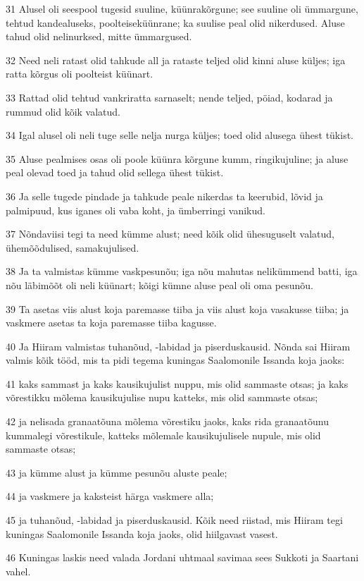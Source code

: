 \par 31 Alusel oli seespool tugesid suuline, küünrakõrgune; see suuline oli ümmargune, tehtud kandealuseks, poolteiseküünrane; ka suulise peal olid nikerdused. Aluse tahud olid nelinurksed, mitte ümmargused.
\par 32 Need neli ratast olid tahkude all ja rataste teljed olid kinni aluse küljes; iga ratta kõrgus oli poolteist küünart.
\par 33 Rattad olid tehtud vankriratta sarnaselt; nende teljed, pöiad, kodarad ja rummud olid kõik valatud.
\par 34 Igal alusel oli neli tuge selle nelja nurga küljes; toed olid alusega ühest tükist.
\par 35 Aluse pealmises osas oli poole küünra kõrgune kumm, ringikujuline; ja aluse peal olevad toed ja tahud olid sellega ühest tükist.
\par 36 Ja selle tugede pindade ja tahkude peale nikerdas ta keerubid, lõvid ja palmipuud, kus iganes oli vaba koht, ja ümberringi vanikud.
\par 37 Nõndaviisi tegi ta need kümme alust; need kõik olid ühesuguselt valatud, ühemõõdulised, samakujulised.
\par 38 Ja ta valmistas kümme vaskpesunõu; iga nõu mahutas nelikümmend batti, iga nõu läbimõõt oli neli küünart; kõigi kümne aluse peal oli oma pesunõu.
\par 39 Ta asetas viis alust koja paremasse tiiba ja viis alust koja vasakusse tiiba; ja vaskmere asetas ta koja paremasse tiiba kagusse.
\par 40 Ja Hiiram valmistas tuhanõud, -labidad ja piserduskausid. Nõnda sai Hiiram valmis kõik tööd, mis ta pidi tegema kuningas Saalomonile Issanda koja jaoks:
\par 41 kaks sammast ja kaks kausikujulist nuppu, mis olid sammaste otsas; ja kaks võrestikku mõlema kausikujulise nupu katteks, mis olid sammaste otsas;
\par 42 ja nelisada granaatõuna mõlema võrestiku jaoks, kaks rida granaatõunu kummalegi võrestikule, katteks mõlemale kausikujulisele nupule, mis olid sammaste otsas;
\par 43 ja kümme alust ja kümme pesunõu aluste peale;
\par 44 ja vaskmere ja kaksteist härga vaskmere alla;
\par 45 ja tuhanõud, -labidad ja piserduskausid. Kõik need riistad, mis Hiiram tegi kuningas Saalomonile Issanda koja jaoks, olid hiilgavast vasest.
\par 46 Kuningas laskis need valada Jordani uhtmaal savimaa sees Sukkoti ja Saartani vahel.
